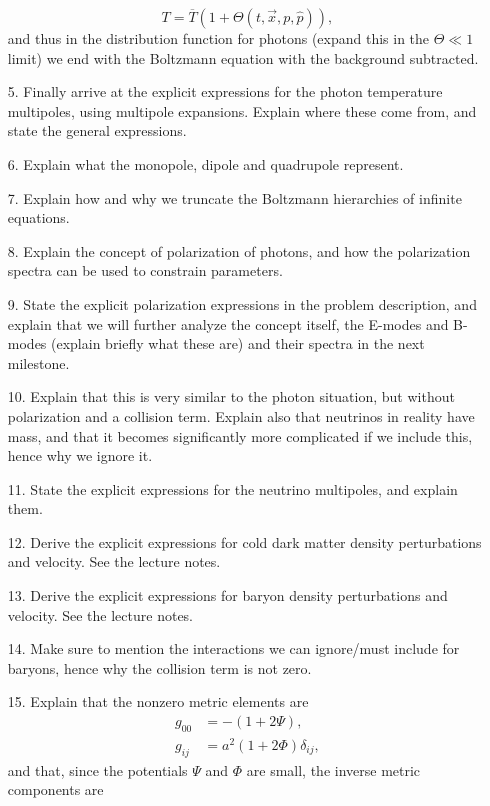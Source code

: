 \documentclass{aa}
\begin{document}
\begin{enumerate}
  \begin{equation}
    T=\overline{T}(1+\Theta(t,\vec{x},p,\hat{p})),
  \end{equation}
  and thus in the distribution function for photons (expand this in the $\Theta\ll1$ limit) we end with the Boltzmann equation with the background subtracted.
  \item [5.] Finally arrive at the explicit expressions for the photon temperature multipoles, using multipole expansions. Explain where these come from, and state the general expressions.
  \item [6.] Explain what the monopole, dipole and quadrupole represent.
  \item [7.] Explain how and why we truncate the Boltzmann hierarchies of infinite equations.
  \item [8.] Explain the concept of polarization of photons, and how the polarization spectra can be used to constrain parameters. 
  \item [9.] State the explicit polarization expressions in the problem description, and explain that we will further analyze the concept itself, the E-modes and B-modes (explain briefly what these are) and their spectra in the next milestone.
  \item [10.] Explain that this is very similar to the photon situation, but without polarization and a collision term. Explain also that neutrinos in reality have mass, and that it becomes significantly more complicated if we include this, hence why we ignore it.
  \item [11.] State the explicit expressions for the neutrino multipoles, and explain them.
  \item [12.] Derive the explicit expressions for cold dark matter density perturbations and velocity. See the lecture notes.
  \item [13.] Derive the explicit expressions for baryon density perturbations and velocity. See the lecture notes.
  \item [14.] Make sure to mention the interactions we can ignore/must include for baryons, hence why the collision term is not zero.
  \item [15.] Explain that the nonzero metric elements are
  \begin{align}
    g_{00} &= -\left(1+2\Psi \right),
    \\
    g_{ij} &= a^2\left(1+2\Phi \right)\delta_{ij},
  \end{align}
  and that, since the potentials $\Psi$ and $\Phi$ are small, the inverse metric components are

\end{enumerate}
\end{document}
